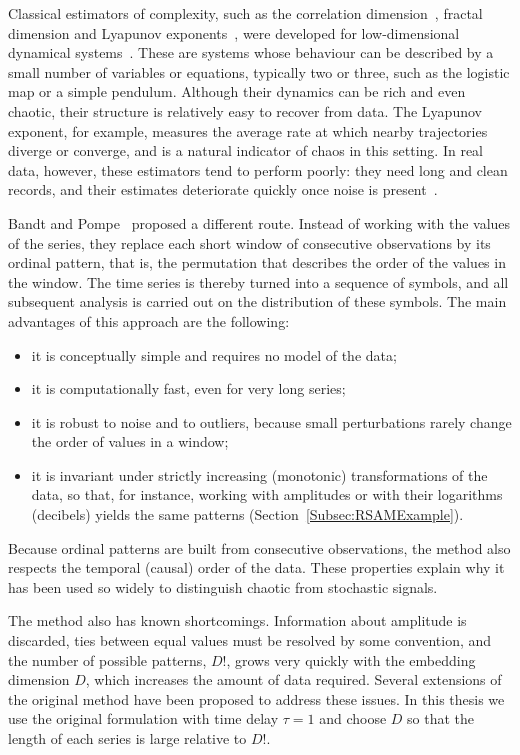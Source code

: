 Classical estimators of complexity, such as the correlation dimension~\cite{Grassberger1983}, fractal dimension and Lyapunov exponents~\cite{Wolf1985}, were developed for low-dimensional dynamical systems~\cite{Huffaker2018}. These are systems whose behaviour can be described by a small number of variables or equations, typically two or three, such as the logistic map or a simple pendulum. Although their dynamics can be rich and even chaotic, their structure is relatively easy to recover from data. The Lyapunov exponent, for example, measures the average rate at which nearby trajectories diverge or converge, and is a natural indicator of chaos in this setting. In real data, however, these estimators tend to perform poorly: they need long and clean records, and their estimates deteriorate quickly once noise is present~\cite{PhysRevLett.88.174102,Huffaker2018}.

Bandt and Pompe~\cite{PhysRevLett.88.174102} proposed a different route. Instead of working with the values of the series, they replace each short window of consecutive observations by its ordinal pattern, that is, the permutation that describes the order of the values in the window. The time series is thereby turned into a sequence of symbols, and all subsequent analysis is carried out on the distribution of these symbols. The main advantages of this approach are the following:
\begin{itemize}
	\item it is conceptually simple and requires no model of the data;
	\item it is computationally fast, even for very long series;
	\item it is robust to noise and to outliers, because small perturbations rarely change the order of values in a window;
	\item it is invariant under strictly increasing (monotonic) transformations of the data, so that, for instance, working with amplitudes or with their logarithms (decibels) yields the same patterns (Section~\ref{Subsec:RSAMExample}).
\end{itemize}
Because ordinal patterns are built from consecutive observations, the method also respects the temporal (causal) order of the data. These properties explain why it has been used so widely to distinguish chaotic from stochastic signals.

The method also has known shortcomings. Information about amplitude is discarded, ties between equal values must be resolved by some convention, and the number of possible patterns, $D!$, grows very quickly with the embedding dimension $D$, which increases the amount of data required. Several extensions of the original method have been proposed to address these issues. In this thesis we use the original formulation with time delay $\tau=1$ and choose $D$ so that the length of each series is large relative to $D!$.

